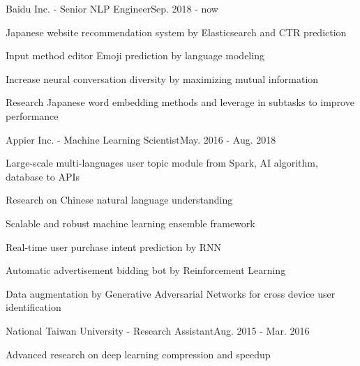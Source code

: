 \documentclass{joel_cv}
\begin{document}
\begin{cvHeader} 
\end{cvHeader}

%
%

\begin{profExp}{Baidu Inc. - Senior NLP Engineer}{Sep. 2018 - now}
	\item Japanese website recommendation system by Elasticsearch and CTR prediction
	\item Input method editor Emoji prediction by language modeling
	\item Increase neural conversation diversity by maximizing mutual information
	\item Research Japanese word embedding methods and leverage in subtasks to improve performance
\end{profExp}

\begin{profExp}{Appier Inc. - Machine Learning Scientist}{May. 2016 - Aug. 2018}
	\item Large-scale multi-languages user topic module from Spark, AI algorithm, database to APIs
	\item Research on Chinese natural language understanding
	\item Scalable and robust machine learning ensemble framework
	\item Real-time user purchase intent prediction by RNN
	\item Automatic advertisement bidding bot by Reinforcement Learning
	\item Data augmentation by Generative Adversarial Networks for cross device user identification
\end{profExp}

\begin{profExp}{National Taiwan University - Research Assistant}{Aug. 2015 - Mar. 2016}
	\item Advanced research on deep learning compression and speedup
\end{profExp}

\end{document}
